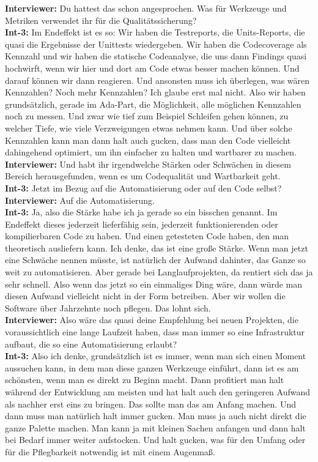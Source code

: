 \textbf{Interviewer:} Du hattest das schon angesprochen. Was für Werkzeuge und Metriken verwendet ihr für die Qualitätssicherung?\\
\textbf{Int-3:} Im Endeffekt ist es so: Wir haben die Testreports, die Units-Reports, die quasi die Ergebnisse der Unittests wiedergeben. Wir haben die Codecoverage als Kennzahl und wir haben die statische Codeanalyse, die uns dann Findings quasi hochwirft, wenn wir hier und dort am Code etwas besser machen können. Und darauf können wir dann reagieren. Und ansonsten muss ich überlegen, was wären Kennzahlen? Noch mehr Kennzahlen? Ich glaube erst mal nicht. Also wir haben grundsätzlich, gerade im Ada-Part, die Möglichkeit, alle möglichen Kennzahlen noch zu messen. Und zwar wie tief zum Beispiel Schleifen gehen können, zu welcher Tiefe, wie viele Verzweigungen etwas nehmen kann. Und über solche Kennzahlen kann man dann halt auch gucken, dass man den Code vielleicht dahingehend optimiert, um ihn einfacher zu halten und wartbarer zu machen.\\
\textbf{Interviewer:} Und habt ihr irgendwelche Stärken oder Schwächen in diesem Bereich herausgefunden, wenn es um Codequalität und Wartbarkeit geht. \\
\textbf{Int-3:} Jetzt im Bezug auf die Automatisierung oder auf den Code selbst? \\
\textbf{Interviewer:} Auf die Automatisierung. \\
\textbf{Int-3:} Ja, also die Stärke habe ich ja gerade so ein bisschen genannt. Im Endeffekt dieses jederzeit lieferfähig sein, jederzeit funktionierenden oder kompilierbaren Code zu haben. Und einen getesteten Code haben, den man theoretisch ausliefern kann. Ich denke, das ist eine große Stärke. Wenn man jetzt eine Schwäche nennen müsste, ist natürlich der Aufwand dahinter, das Ganze so weit zu automatisieren. Aber gerade bei Langlaufprojekten, da rentiert sich das ja sehr schnell. Also wenn das jetzt so ein einmaliges Ding wäre, dann würde man diesen Aufwand vielleicht nicht in der Form betreiben. Aber wir wollen die Software über Jahrzehnte noch pflegen. Das lohnt sich. \\
\textbf{Interviewer:} Also wäre das quasi deine Empfehlung bei neuen Projekten, die voraussichtlich eine lange Laufzeit haben, dass man immer so eine Infrastruktur aufbaut, die so eine Automatisierung erlaubt?\\
\textbf{Int-3:} Also ich denke, grundsätzlich ist es immer, wenn man sich einen Moment aussuchen kann, in dem man diese ganzen Werkzeuge einführt, dann ist es am schönsten, wenn man es direkt zu Beginn macht. Dann profitiert man halt während der Entwicklung am meisten und hat halt auch den geringeren Aufwand als nachher erst eins zu bringen. Das sollte man das am Anfang machen. Und dann muss man natürlich halt immer gucken. Man muss ja auch nicht direkt die ganze Palette machen. Man kann ja mit kleinen Sachen anfangen und dann halt bei Bedarf immer weiter aufstocken. Und halt gucken, was für den Umfang oder für die Pflegbarkeit notwendig ist mit einem Augenmaß. \\
